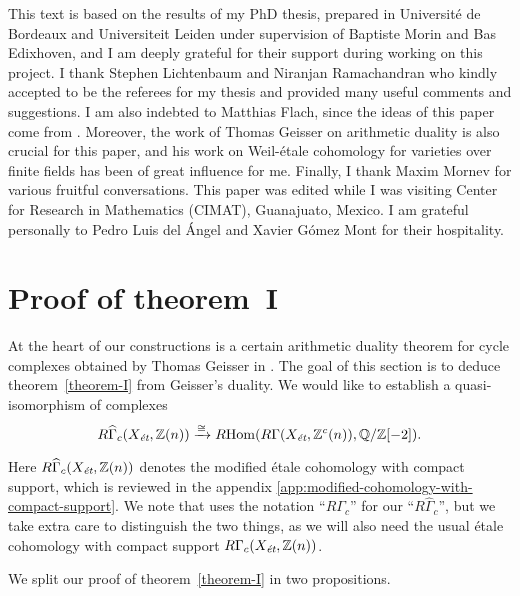\documentclass[leqno,12pt]{article}
\theoremstyle{plain}
\theoremstyle{definition}
\DeclareMathOperator{\Hom}{Hom}
\newcommand{\QQ}{\mathbb{Q}}
\newcommand{\ZZ}{\mathbb{Z}}
\newcommand{\et}{\text{\it \'{e}t}}
\newcommand{\RHom}{R\!\Hom}
\begin{document}
This text is based on the results of my PhD thesis, prepared in Universit\'{e} de
Bordeaux and Universiteit Leiden under supervision of Baptiste Morin and Bas
Edixhoven, and I am deeply grateful for their support during working on this
project. I thank Stephen Lichtenbaum and Niranjan Ramachandran who kindly
accepted to be the referees for my thesis and provided many useful comments and
suggestions. I am also indebted to Matthias Flach, since the ideas of this paper
come from \cite{Flach-Morin-2018}. Moreover, the work of Thomas Geisser on
arithmetic duality \cite{Geisser-2010} is also crucial for this paper, and his
work on Weil-\'{e}tale cohomology for varieties over finite fields
\cite{Geisser-2004,Geisser-2006,Geisser-2010-arithmetic-homology} has been of
great influence for me. Finally, I thank Maxim Mornev for various fruitful
conversations. This paper was edited while I was visiting Center for Research
in Mathematics (CIMAT), Guanajuato, Mexico. I am grateful personally to Pedro Luis del
\'{A}ngel and Xavier G\'{o}mez Mont for their hospitality.


\section{Proof of theorem~I}
\label{sec:arithmetic-duality-theorem}

At the heart of our constructions is a certain arithmetic duality theorem for
cycle complexes obtained by Thomas Geisser in \cite{Geisser-2010}. The goal of
this section is to deduce theorem~\ref{theorem-I} from Geisser's duality.
We would like to establish a quasi-isomorphism of complexes
\[ R\widehat{\Gamma}_c (X_\et, \ZZ (n)) \xrightarrow{\cong}
\RHom (R\Gamma (X_\et, \ZZ^c (n)), \QQ/\ZZ [-2]). \]

Here $R\widehat{\Gamma}_c (X_\et, \ZZ (n))$ denotes the modified \'{e}tale
cohomology with compact support, which is reviewed in the appendix
\ref{app:modified-cohomology-with-compact-support}. We note that
\cite{Geisser-2010} uses the notation ``$R\Gamma_c$'' for our
``$R\widehat{\Gamma}_c$'', but we take extra care to distinguish the two things,
as we will also need the usual \'{e}tale cohomology with compact support
$R\Gamma_c (X_\et, \ZZ (n))$.

We split our proof of theorem~\ref{theorem-I} in two propositions.
\end{document}
